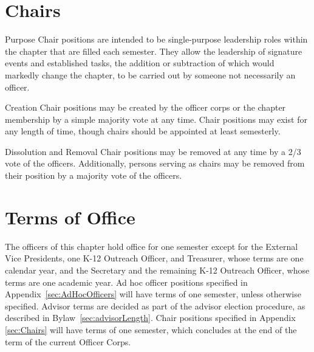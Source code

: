 \section{Chairs}
\begin{enumsubsection}

\item{Purpose}
Chair positions are intended to be single-purpose leadership roles within the chapter that are filled each semester.
They allow the leadership of signature events and established tasks, the addition or subtraction of which would markedly change the chapter, to be carried out by someone not necessarily an officer.
\item{Creation}
Chair positions may be created by the officer corps or the chapter membership by a simple majority vote at any time.
Chair positions may exist for any length of time, though chairs should be appointed at least semesterly.
\item{Dissolution and Removal}
Chair positions may be removed at any time by a 2/3 vote of the officers.
Additionally, persons serving as chairs may be removed from their position by a majority vote of the officers.
\end{enumsubsection}

\section{Terms of Office}
The officers of this chapter hold office for one semester except for the External Vice Presidents, one K-12 Outreach Officer, and Treasurer, whose terms are one calendar year, and the Secretary and the remaining K-12 Outreach Officer, whose terms are one academic year.
Ad hoc officer positions specified in Appendix~\ref{sec:AdHocOfficers} will have terms of one semester, unless otherwise specified.
Advisor terms are decided as part of the advisor election procedure, as described in Bylaw~\ref{sec:advisorLength}.
Chair positions specified in Appendix \ref{sec:Chairs} will have terms of one semester, which concludes at the end of the term of the current Officer Corps.
